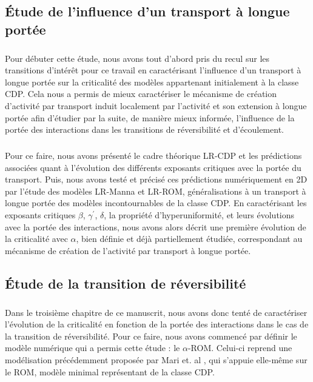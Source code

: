 \subsection*{Étude de l'influence d'un transport à longue portée}

\subparagraph{}Pour débuter cette étude, nous avons tout d'abord pris du recul sur les transitions d'intérêt pour ce travail en caractérisant l'influence d'un transport à longue portée sur la criticalité des modèles appartenant initialement à la classe CDP. Cela nous a permis de mieux caractériser le mécanisme de création d'activité par transport induit localement par l'activité et son extension à longue portée afin d'étudier par la suite, de manière mieux informée, l'influence de la portée des interactions dans les transitions de réversibilité et d'écoulement. 

\subparagraph{}Pour ce faire, nous avons présenté le cadre théorique LR-CDP et les prédictions associées quant à l'évolution des différents exposants critiques avec la portée du transport. Puis, nous avons testé et précisé ces prédictions numériquement en 2D par l'étude des modèles LR-Manna et LR-ROM, généralisations à un transport à longue portée des modèles incontournables de la classe CDP. En caractérisant les exposants critiques $\beta$, $\gamma^\prime$, $\delta$, la propriété d'hyperuniformité, et leurs évolutions avec la portée des interactions, nous avons alors décrit une première évolution de la criticalité avec $\alpha$, bien définie et déjà partiellement étudiée, correspondant au mécanisme de création de l'activité par transport à longue portée.

\subsection*{Étude de la transition de réversibilité}

\subparagraph{}Dans le troisième chapitre de ce manuscrit, nous avons donc tenté de caractériser l'évolution de la criticalité en fonction de la portée des interactions dans le cas de la transition de réversibilité. Pour ce faire, nous avons commencé par définir le modèle numérique qui a permis cette étude : le $\alpha$-ROM. Celui-ci reprend une modélisation précédemment proposée par Mari et. al \cite{mari_absorbing_2022}, qui s'appuie elle-même sur le ROM, modèle minimal représentant de la classe CDP. 


